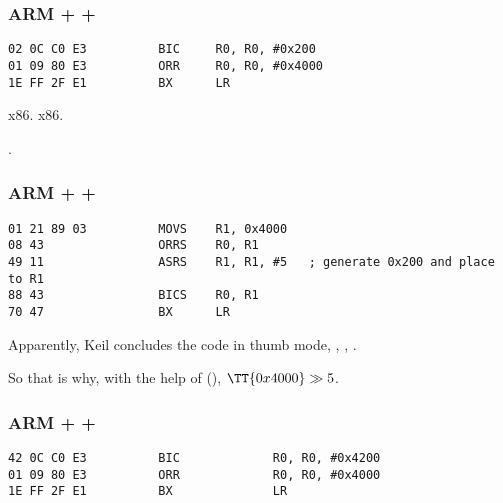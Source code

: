 \subsubsection{ARM + \OptimizingKeil + \ARMMode}

\begin{lstlisting}[caption=\OptimizingKeil + \ARMMode]
02 0C C0 E3          BIC     R0, R0, #0x200
01 09 80 E3          ORR     R0, R0, #0x4000
1E FF 2F E1          BX      LR
\end{lstlisting}

  \ANDIns \InENRU x86.
  \OR \InENRU x86.

.

\subsubsection{ARM + \OptimizingKeil + \ThumbMode}

\begin{lstlisting}[caption=\OptimizingKeil + \ThumbMode]
01 21 89 03          MOVS    R1, 0x4000
08 43                ORRS    R0, R1
49 11                ASRS    R1, R1, #5   ; generate 0x200 and place to R1
88 43                BICS    R0, R1
70 47                BX      LR
\end{lstlisting}

{Apparently, Keil concludes the code in thumb mode},
   , 
, 
  .

{So that is why, with the help of}  
(\ASRdesc),  $\TT{0x4000} \gg 5$.

\subsubsection{ARM + \OptimizingXcode + \ARMMode}
\label{anomaly:LLVM}
\index{\CompilerAnomaly}

\begin{lstlisting}[caption=\OptimizingXcode + \ARMMode]
42 0C C0 E3          BIC             R0, R0, #0x4200
01 09 80 E3          ORR             R0, R0, #0x4000
1E FF 2F E1          BX              LR
\end{lstlisting}

